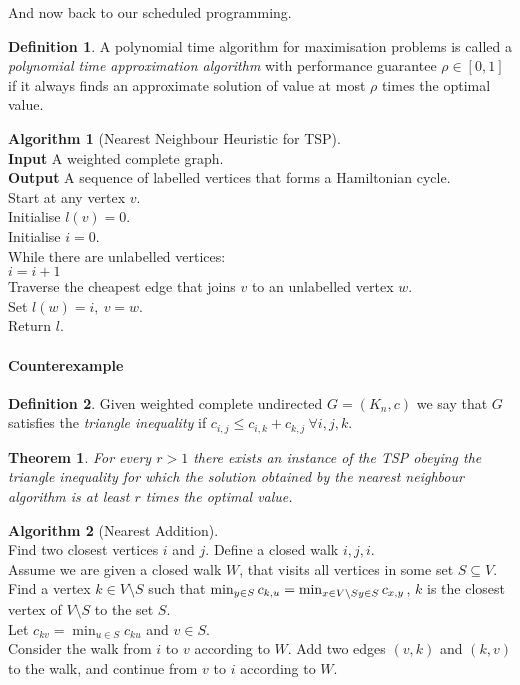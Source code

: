 \documentclass{article}
\newtheorem*{thm}{Theorem}
\theoremstyle{definition}
\newtheorem*{defn}{Definition}
\newtheorem*{alg}{Algorithm}
\begin{document}
And now back to our scheduled programming.

\begin{defn}
A polynomial time algorithm for maximisation problems is called a \emph{polynomial time approximation algorithm} with performance guarantee $\rho\in [ 0,1 ]$ if it always finds an approximate solution of value at most $\rho$ times the optimal value.
\end{defn}

\begin{alg}[Nearest Neighbour Heuristic for TSP]~\\
\textbf{Input} A weighted complete graph. \\
\textbf{Output} A sequence of labelled vertices that forms a Hamiltonian cycle.\\
Start at any vertex $v$.\\
Initialise $l(v) = 0$.\\
Initialise $i=0$.\\
While there are unlabelled vertices: \\
\indent $i = i+1$ \\
\indent Traverse the cheapest edge that joins $v$ to an unlabelled vertex $w$. \\
\indent Set $l(w) = i,\ v=w$.\\
Return $l$.
\end{alg}

\paragraph{Counterexample}

\begin{defn}
Given weighted complete undirected $G=(K_n, c)$ we say that $G$ satisfies the \emph{triangle inequality} if $c_{i,j}\le c_{i,k} + c_{k,j}\ \forall i,j,k$.
\end{defn}

\begin{thm}
For every $r > 1$ there exists an instance of the TSP obeying the triangle inequality for which the solution obtained by the nearest neighbour algorithm is at least $r$ times the optimal value.
\end{thm}

\begin{alg}[Nearest Addition]~\\
Find two closest vertices $i$ and $j$.
Define a closed walk $i,j,i$. \\
Assume we are given a closed walk $W$, that visits all vertices in some set $S\subseteq V$.\\
\indent Find a vertex $k\in V\setminus S$ such that $\min_{y\in S} c_{k,u} = \min_{x\in V\setminus S \\ y\in S} c_{x,y}$, $k$ is the closest vertex of $V\setminus S$ to the set $S$. \\
\indent Let $c_{kv} = \min_{u\in S} c_{ku}$ and $v \in S$. \\
\indent Consider the walk from $i$ to $v$ according to $W$.
Add two edges $(v,k)$ and $(k,v)$ to the walk, and continue from $v$ to $i$ according to $W$.
\end{alg}
\end{document}

